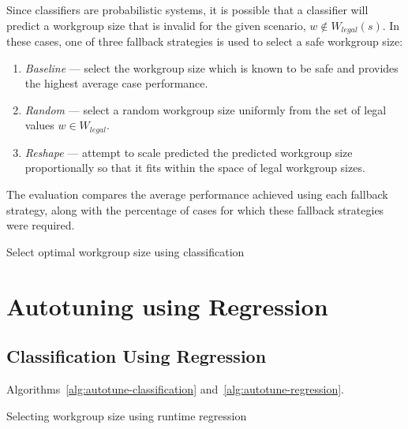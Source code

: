 Since classifiers are probabilistic systems, it is possible that a
classifier will predict a workgroup size that is invalid for the given
scenario, $w \not\in W_{legal}(s)$. In these cases, one of three
fallback strategies is used to select a safe workgroup size:

\begin{enumerate}
\item \emph{Baseline} --- select the workgroup size which is known to be
  safe and provides the highest average case performance.
\item \emph{Random} --- select a random workgroup size uniformly from
  the set of legal values $w \in W_{legal}$.
\item \emph{Reshape} --- attempt to scale predicted the predicted
  workgroup size proportionally so that it fits within the space of
  legal workgroup sizes.
\end{enumerate}

The evaluation compares the average performance achieved using each
fallback strategy, along with the percentage of cases for which these
fallback strategies were required.

\begin{algorithm}

\caption{Select optimal workgroup size using classification}
\label{alg:autotune-classification}
\end{algorithm}


\section{Autotuning using Regression}


\subsection{Classification Using Regression}

Algorithms~\ref{alg:autotune-classification} and~\ref{alg:autotune-regression}.

\begin{algorithm}

\caption{Selecting workgroup size using runtime regression}
\label{alg:autotune-runtime-regression}
\end{algorithm}

